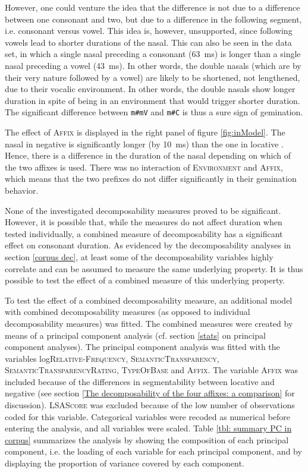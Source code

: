 However, one could venture the idea that the difference is not due to a difference between one consonant and two, but due to a difference in the following segment, i.e. consonant versus vowel. This idea is, however, unsupported, since following vowels lead to shorter durations of the nasal. This can also be seen in the data set, in which a single nasal preceding a consonant (63~ms) is longer than a single nasal preceding a vowel (43~ms). In other words, the double nasals (which are by their very nature followed by a vowel) are likely to be shortened, not lengthened, due to their vocalic environment. In other words, the double nasals show longer duration in spite of being in an environment that would trigger shorter duration. The significant difference between \texttt{m\#mV}  and \texttt{m\#C} is thus a sure sign of gemination.



The effect of \textsc{Affix} is displayed  in the right panel of figure \ref{fig:inModel}. The nasal in negative  is significantly longer (by 10~ms) than the one in locative . Hence, there is a difference in the duration of the nasal depending on which of the two affixes is used. There was no interaction of \textsc{Environment} and \textsc{Affix}, which means that the two prefixes do not differ significantly in their gemination behavior.


None of the investigated decomposability measures proved to be significant. However, it is possible that, while the measures do not affect duration when tested individually, a combined measure of decomposability has a significant effect on consonant duration. As evidenced by the decomposability analyses in section \ref{corpus dec}, at least some of the decomposability variables highly correlate and can be assumed to measure the same underlying property. It is thus possible to test the effect of a combined measure of this underlying property. 

To test the effect of a combined decomposability measure, an additional model with combined decomposability measures (as opposed to individual decomposability measures) was fitted. The combined measures were created by means of a principal component analysis (cf. section \ref{stats} on principal component analyses). 
The principal component analysis was fitted with the variables log\textsc{Relative-Frequency}, \textsc{SemanticTransparency}, \textsc{SemanticTransparencyRating}, \textsc{TypeOfBase} and \textsc{Affix}. The variable \textsc{Affix} was included because of the differences in segmentability between locative and negative  (see section \ref{The decomposability of the four affixes: a comparison} for discussion). \textsc{LSAScore} was excluded because of the low number of observations coded for this variable. Categorical variables were recoded as numerical before entering the analysis, and all variables were scaled.
Table \ref{tbl: summary PC in corpus} summarizes the analysis by showing the composition of each principal component, i.e. the loading of each variable for each principal component, and by displaying the proportion of variance covered by each component. 


